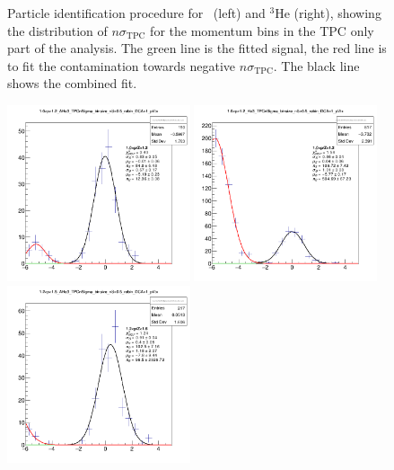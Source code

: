 \begin{figure}
    \caption{Particle identification procedure for \ahe\ (left) and $^3\mathrm{He}$ (right), showing the distribution of $n\sigma_{\mathrm{TPC}}$ for the momentum bins in the TPC only part of the analysis. The green line is the fitted signal, the red line is to fit the contamination towards negative $n\sigma_{\mathrm{TPC}}$. The black line shows the combined fit.}
    \label{fig:he3_TPC_PID}
\end{figure}

\begin{figure}
    \centering
    \includegraphics[width=0.48\textwidth]{figures/Selected_Plots/1.0<p<1.2_AHe3_TPCnSigma_binsize_nS=0.5_rebin_DCA=1_pVtx.png}
    \includegraphics[width=0.48\textwidth]{figures/Selected_Plots/1.0<p<1.2_He3_TPCnSigma_binsize_nS=0.5_rebin_DCA=1_pVtx.png}
    \includegraphics[width=0.48\textwidth]{figures/Selected_Plots/1.2<p<1.5_AHe3_TPCnSigma_binsize_nS=0.5_rebin_DCA=1_pVtx.png}

\end{figure}
